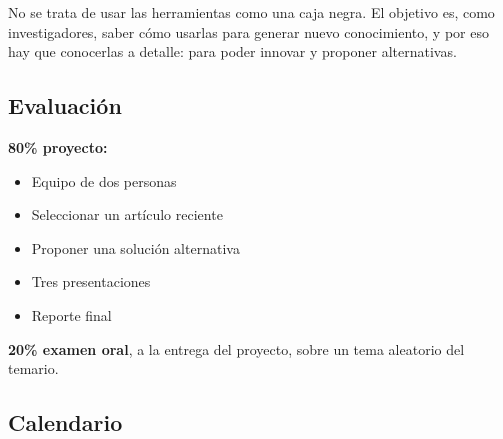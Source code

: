 \documentclass[11pt,letterpaper]{article}
\begin{document}
\begin{idea}
  No se trata de usar las herramientas como una caja negra. El
  objetivo es, como investigadores, saber cómo usarlas para generar
  nuevo conocimiento, y por eso hay que conocerlas a detalle: para
  poder innovar y proponer alternativas.
\end{idea}


\subsection*{Evaluación}

\textbf{80\% proyecto:}
\begin{itemize}[itemsep=0.1em]
    \item Equipo de dos personas
    \item Seleccionar un artículo reciente
    \item Proponer una solución alternativa
    \item Tres presentaciones
    \item Reporte final
\end{itemize}

\textbf{20\% examen oral}, a la entrega del proyecto, sobre un tema
aleatorio del temario.


\subsection*{Calendario}
\end{document}
